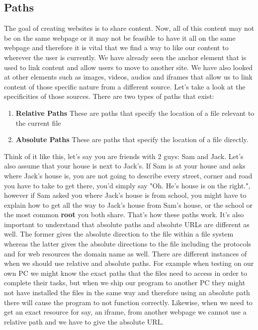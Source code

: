 \documentclass[11pt]{article}
\begin{document}
\subsection{Paths}
\label{sec:orgb888483}
The goal of creating websites is to share content. Now, all of this content may not be on the same
webpage or it may not be feasible to have it all on the same webpage and therefore it is vital that
we find a way to like our content to wherever the user is currently. We have already seen the anchor
element that is used to link content and allow users to move to another site. We have also looked at
other elements such as images, videos, audios and iframes that allow us to link content of those
specific nature from a different source.
Let's take a look at the specificities of those sources. There are two types of paths that exist:
\begin{enumerate}
\item \textbf{Relative Paths}
These are paths that specify the location of a file relevant to the current file
\item \textbf{Absolute Paths}
These are paths that specify the location of a file directly.
\end{enumerate}
Think of it like this, let's say you are friends with 2 guys: Sam and Jack. Let's also assume that
your house is next to Jack's. If Sam is at your house and asks where Jack's house is, you are not
going to describe every street, corner and road you have to take to get there, you'd simply say
"Oh. He's house is on the right.", however if Sam asked you where Jack's house is from school, you
might have to explain how to get all the way to Jack's house from Sam's house, or the school or the
most common \textbf{root} you both share.
That's how these paths work. It's also important to understand that absolute paths and absolute URLs
are different as well. The former gives the absolute direction to the file within a file system
whereas the latter gives the absolute directions to the file including the protocols and for web
resources the domain name as well.
There are different instances of when we should use relative and absolute paths. For example when
testing on our own PC we might know the exact paths that the files need to access in order to
complete their tasks, but when we ship our program to another PC they might not have installed the
files in the same way and therefore using an absolute path there will cause the program to not
function correctly. Likewise, when we need to get an exact resource for say, an iframe, from another
webpage we cannot use a relative path and we have to give the absolute URL.
\end{document}
